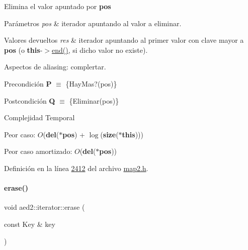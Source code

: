 Elimina el valor apuntado por {\bfseries pos} 


\begin{DoxyParams}{Parámetros}
{\em pos} & iterador apuntando al valor a eliminar. \\
\hline
\end{DoxyParams}

\begin{DoxyRetVals}{Valores devueltos}
{\em res} & iterador apuntando al primer valor con clave mayor a {\bfseries pos} (o {\bfseries this}-\/$>$\hyperlink{classaed2_1_1iterator_a67caf9468be999e9be96b7add5d79946_a67caf9468be999e9be96b7add5d79946}{end()}, si dicho valor no existe).\\
\hline
\end{DoxyRetVals}
\begin{DoxyParagraph}{Aspectos de aliasing\+:}
complertar.
\end{DoxyParagraph}
\begin{DoxyPrecond}{Precondición}
{\bfseries P} $\equiv$ \{Hay\+Mas?(pos)\} 
\end{DoxyPrecond}
\begin{DoxyPostcond}{Postcondición}
{\bfseries Q} $\equiv$ \{Eliminar(pos)\}
\end{DoxyPostcond}

\begin{DoxyDescription}
\item[Complejidad Temporal]
\begin{DoxyItemize}
\item Peor caso\+: $O$({\bfseries del}({\bfseries $\ast$pos}) + $\log$({\bfseries size}({\bfseries $\ast$this})))
\item Peor caso amortizado\+: $O$({\bfseries del}({\bfseries $\ast$pos})) 
\end{DoxyItemize}
\end{DoxyDescription}

Definición en la línea \hyperlink{map2_8h_source_l02412}{2412} del archivo \hyperlink{map2_8h_source}{map2.\+h}.

\mbox{\label{classaed2_1_1iterator_a0a0e62b2a2c0fb98f431164c66a6e388_a0a0e62b2a2c0fb98f431164c66a6e388}} 
\paragraph{\texorpdfstring{erase()}{erase()}\hspace{0.1cm}{\footnotesize\ttfamily [2/2]}}
{\footnotesize\ttfamily void aed2\+::iterator\+::erase (\begin{DoxyParamCaption}\item[{const Key \&}]{key }\end{DoxyParamCaption})\hspace{0.3cm}{\ttfamily [inline]}}



